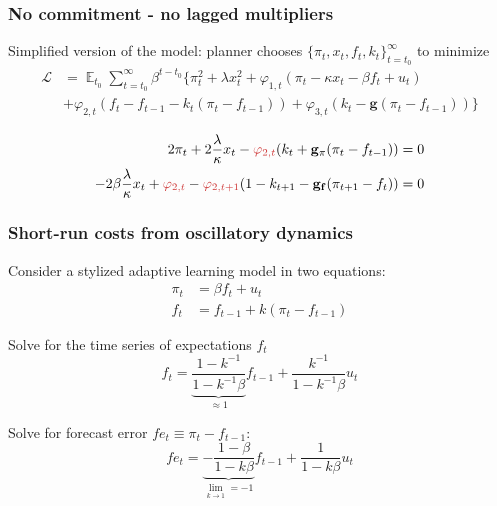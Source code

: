 \documentclass[11pt]{beamer}
\DeclareMathOperator{\E}{\mathbb{E}}
\begin{document}
\begin{frame}[plain]  %
	\frametitle{No commitment - no lagged multipliers}
	\label{no_commitment_intuition}
	
	Simplified version of the model: planner chooses $\{\pi_t, x_t, f_t, k_t\}_{t=t_0}^{\infty}$ to minimize
 \begin{align*}
\mathcal{L} &= \E_{t_0}\sum_{t=t_0}^{\infty} \beta^{t-t_0}\bigg\{ \pi_t^2  + \lambda x_t^2 + \varphi_{1,t} (\pi_t -\kappa x_t- \beta f_t +u_t) \\ &+ \varphi_{2,t}(f_t - f_{t-1} -k_t(\pi_t - f_{t-1})) + \varphi_{3,t}(k_t- \mathbf{g}(\pi_t - f_{t-1})) \bigg\}
 \end{align*}

 \begin{align}
  2\pi_t +2\frac{\lambda}{\kappa}x_t -\textcolor{brownreddark}{\varphi_{2,t}}(k_t + \mathbf{g_{\pi}}(\pi_t -f_{t-1}))& = 0 \label{simpleFOC1} \\
  -2\beta\frac{\lambda}{\kappa}x_t + \textcolor{brownreddark}{\varphi_{2,t}} -\textcolor{brownreddark}{\varphi_{2,t+1}}(1-k_{t+1} -\mathbf{g_{f}}(\pi_{t+1} -f_{t})) & = 0 \label{simpleFOC2} 
 \end{align}

  
\hyperlink{no_commitment}{}	


\end{frame}

\begin{frame}[plain]  %
	\frametitle{Short-run costs from oscillatory dynamics}
	\label{SRcosts}

 Consider a stylized adaptive learning model in two equations:
\begin{align}
\pi_t & = \beta f_t + u_t \label{simple_NKPC} \\
f_t & = f_{t-1} + k(\pi_t - f_{t-1}) \label{simple_expectations}
\end{align}

Solve for the time series of expectations $f_t$
\begin{equation}
f_t = \underbrace{\frac{1-k^{-1}}{1-k^{-1}\beta}}_{\approx 1}f_{t-1} + \frac{k^{-1}}{1-k^{-1}\beta}u_t
\end{equation}

Solve for forecast error $fe_t \equiv \pi_t - f_{t-1}$:
\begin{equation}
fe_t = \underbrace{-\frac{1-\beta}{1-k\beta}}_{\lim_{k \to 1} = -1}f_{t-1} + \frac{1}{1-k\beta}u_t \label{oscillating_fe}
\end{equation}

 
\hyperlink{SRLRtradeoffs}{}	


\end{frame}
\end{document}
